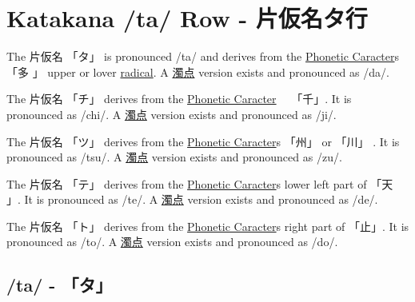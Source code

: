 \section{Katakana /ta/ Row - 片仮名タ行}\label{sec:KatakanaTaRow}


\label{letter:ta} The  片仮名 {「タ」} is pronounced  /ta/ and
derives from the \hyperref[sec:PhoneticCharacter]{Phonetic Caracter}s {「多 」}
upper or lover \hyperref[sec:Radical]{radical}.  A \hyperref[sec:Dakuten]{濁点}
version exists and pronounced as /da/.

\label{letter:chi} The 片仮名 {「チ」} derives from the
\hyperref[sec:PhoneticCharacter]{Phonetic Caracter}　 {「千」}.  It is
pronounced as /chi/.  A \hyperref[sec:Dakuten]{濁点} version exists and
pronounced as /ji/.

\label{letter:tsu} The 片仮名 {「ツ」} derives from the
\hyperref[sec:PhoneticCharacter]{Phonetic Caracter}s {「州」} or {「川」} .  It
is pronounced as /tsu/.  A \hyperref[sec:Dakuten]{濁点} version exists and
pronounced as /zu/. 

\label{letter:te} The 片仮名 {「テ」} derives from the
\hyperref[sec:PhoneticCharacter]{Phonetic Caracter}s lower left part of {「天
」}.  It is pronounced as /te/.  A \hyperref[sec:Dakuten]{濁点} version exists
and pronounced as /de/.  

\newpage

\label{letter:to} The 片仮名 {「ト」} derives from the
\hyperref[sec:PhoneticCharacter]{Phonetic Caracter}s right part of {「止」}.
It is pronounced as /to/.  A \hyperref[sec:Dakuten]{濁点} version exists and
pronounced as /do/.

 

\newpage

\subsection{/ta/ - 「タ」}\label{sec:KatakanaTa}


